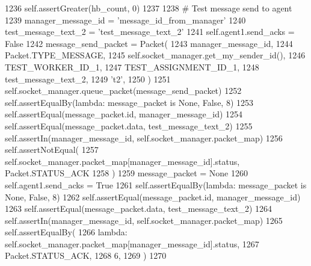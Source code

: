 \begin{DoxyCode}
1236         self.assertGreater(hb\_count, 0)
1237 
1238         \textcolor{comment}{# Test message send to agent}
1239         manager\_message\_id = \textcolor{stringliteral}{'message\_id\_from\_manager'}
1240         test\_message\_text\_2 = \textcolor{stringliteral}{'test\_message\_text\_2'}
1241         self.agent1.send\_acks = \textcolor{keyword}{False}
1242         message\_send\_packet = Packet(
1243             manager\_message\_id,
1244             Packet.TYPE\_MESSAGE,
1245             self.socket\_manager.get\_my\_sender\_id(),
1246             TEST\_WORKER\_ID\_1,
1247             TEST\_ASSIGNMENT\_ID\_1,
1248             test\_message\_text\_2,
1249             \textcolor{stringliteral}{'t2'},
1250         )
1251         self.socket\_manager.queue\_packet(message\_send\_packet)
1252         self.assertEqualBy(\textcolor{keyword}{lambda}: message\_packet \textcolor{keywordflow}{is} \textcolor{keywordtype}{None}, \textcolor{keyword}{False}, 8)
1253         self.assertEqual(message\_packet.id, manager\_message\_id)
1254         self.assertEqual(message\_packet.data, test\_message\_text\_2)
1255         self.assertIn(manager\_message\_id, self.socket\_manager.packet\_map)
1256         self.assertNotEqual(
1257             self.socket\_manager.packet\_map[manager\_message\_id].status, Packet.STATUS\_ACK
1258         )
1259         message\_packet = \textcolor{keywordtype}{None}
1260         self.agent1.send\_acks = \textcolor{keyword}{True}
1261         self.assertEqualBy(\textcolor{keyword}{lambda}: message\_packet \textcolor{keywordflow}{is} \textcolor{keywordtype}{None}, \textcolor{keyword}{False}, 8)
1262         self.assertEqual(message\_packet.id, manager\_message\_id)
1263         self.assertEqual(message\_packet.data, test\_message\_text\_2)
1264         self.assertIn(manager\_message\_id, self.socket\_manager.packet\_map)
1265         self.assertEqualBy(
1266             \textcolor{keyword}{lambda}: self.socket\_manager.packet\_map[manager\_message\_id].status,
1267             Packet.STATUS\_ACK,
1268             6,
1269         )
1270 
\end{DoxyCode}
\mbox{\label{classparlai_1_1mturk_1_1core_1_1legacy__2018_1_1test_1_1test__socket__manager_1_1TestSocketManagerMessageHandling_a16565c26c94302fb17793a4b12a871e1}} 
